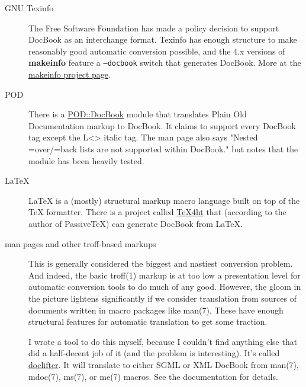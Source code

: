 \documentclass[pdftex,english,a4paper,10pt]{infocom}
\begin{document}
\noindent

\begin{description}
\item[GNU Texinfo]\mbox{} %
The Free Software Foundation has made a policy decision to
support DocBook as an interchange format.  Texinfo has enough
structure to make reasonably good automatic conversion possible, and
the 4.x versions of {\bfseries makeinfo} feature a
{\texttt{{--docbook}}} switch that generates DocBook.  More at the
\href{http://www.gnu.org/directory/texinfo.html}{makeinfo
project page}.
\item[POD]\mbox{} %
There is a \href{http://www.cpan.org/modules/by-module/Pod/}{POD::DocBook}
module that translates Plain Old Documentation markup to DocBook.  It
claims to support every DocBook tag except the L\textless{}\textgreater{} italic tag.
The man page also says "Nested =over/=back lists are not supported
within DocBook." but notes that the module has been heavily
tested.
\item[LaTeX]\mbox{} %
LaTeX is a (mostly) structural markup macro language built on
top of the TeX formatter.  There is a project called \href{http://www.lrz-muenchen.de/services/software/sonstiges/tex4ht/mn.html}{
TeX4ht} that (according to the author of PassiveTeX) can
generate DocBook from LaTeX.
\item[man pages and other troff-based markups]\mbox{} %
This is generally considered the biggest and nastiest conversion
problem.  And indeed, the basic
troff(1) markup is at too low a presentation
level for automatic conversion tools to do much of any good.  However,
the gloom in the picture lightens significantly if we consider
translation from sources of documents written in macro packages like
man(7).  These have enough structural
features for automatic translation to get some traction.

I wrote a tool to do this myself, because I couldn't find
anything else that did a half-decent job of it (and the problem is
interesting).  It's called \href{http://www.tuxedo.org/~esr/doclifter/}{doclifter}.  It will
translate to either SGML or XML DocBook from
man(7),
mdoc(7),
ms(7), or
me(7) macros.  See the documentation
for details.

\end{description}
\end{document}
